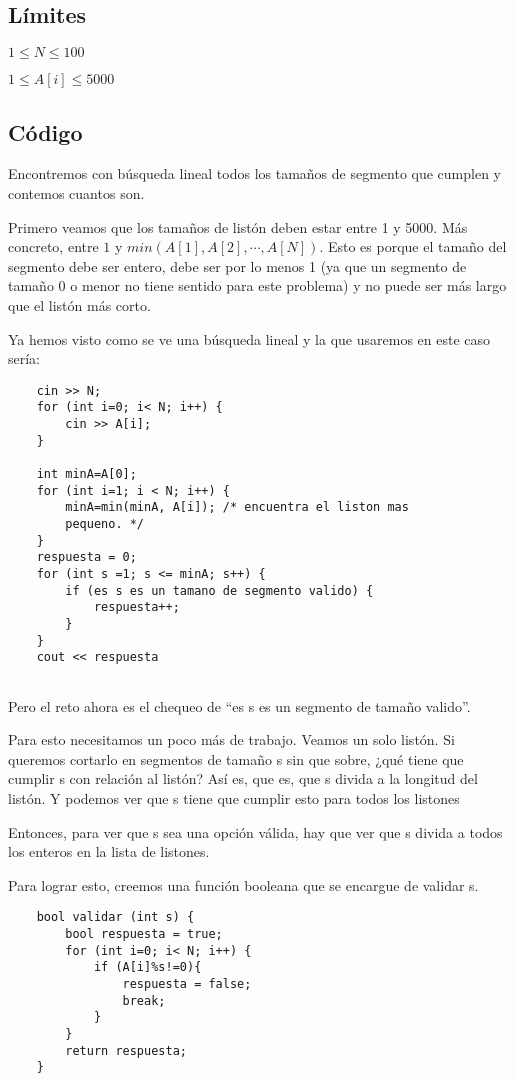 \subsection*{Límites}
\begin{plimits}
	\item \(1\leq N \leq 100\)
	\item \(1\leq A[i] \leq 5000\)
\end{plimits}

\subsection*{Código}
Encontremos con búsqueda lineal todos los tamaños de segmento que cumplen y contemos cuantos son.

Primero veamos que los tamaños de listón deben estar entre 1 y 5000. Más concreto, entre \(1\) y \(min (A[1],A[2],\cdots ,A[N])\). Esto es porque el tamaño del segmento debe ser entero, debe ser por lo menos 1 (ya que un segmento de tamaño 0 o menor no tiene sentido para este problema) y no puede ser más largo que el listón más corto.

Ya hemos visto como se ve una búsqueda lineal y la que usaremos en este caso sería:

\begin{lstlisting}
	cin >> N;
	for (int i=0; i< N; i++) {
		cin >> A[i];
	}
	
	int minA=A[0];
	for (int i=1; i < N; i++) {
		minA=min(minA, A[i]); /* encuentra el liston mas
		pequeno. */
	}
	respuesta = 0;
	for (int s =1; s <= minA; s++) {
		if (es s es un tamano de segmento valido) {
			respuesta++;
		}
	}
	cout << respuesta
	
\end{lstlisting}

Pero el reto ahora es el chequeo de “es s es un segmento de tamaño valido”.

Para esto necesitamos un poco más de trabajo. Veamos un solo listón. Si queremos cortarlo en segmentos de tamaño s sin que sobre, ¿qué tiene que cumplir s con relación al listón? Así es, que es, que s divida a la longitud del listón. Y podemos ver que s tiene que cumplir esto para todos los listones

Entonces, para ver que s sea una opción válida, hay que ver que s divida a todos los enteros en la lista de listones.

Para lograr esto, creemos una función booleana que se encargue de validar s.
\begin{lstlisting}
	bool validar (int s) {
		bool respuesta = true;
		for (int i=0; i< N; i++) {
			if (A[i]%s!=0){
				respuesta = false;
				break;
			}
		}
		return respuesta;
	}
\end{lstlisting}

